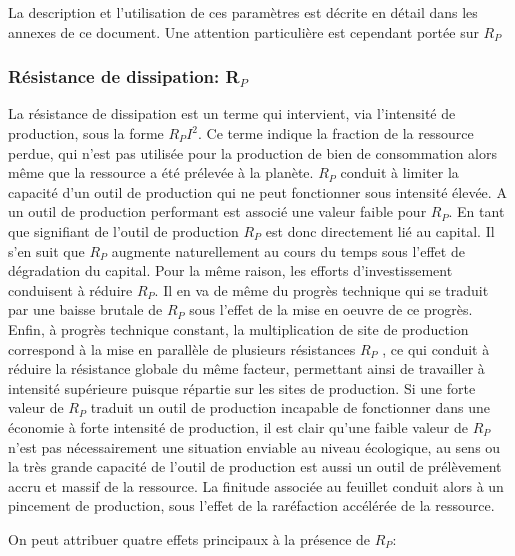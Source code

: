 \documentclass[12pt,a4paper]{article}%
\begin{document}
La description et l'utilisation de ces paramètres est décrite en détail
dans les annexes de ce document. Une attention particulière est cependant
portée sur $R_{P}$

\subsubsection{Résistance de dissipation: R$_{P}$}

La résistance de dissipation est un terme qui intervient, via l'intensité de
production, sous la forme $R_{P}I^{2}$. Ce terme indique la fraction de la
ressource perdue, qui n'est pas utilisée pour la production de bien de consommation
alors même que la ressource a été prélevée à la planète. $R_{P}$
conduit à limiter la capacité d'un outil de production qui ne peut
fonctionner sous intensité élevée. A un outil de production performant est
associé une valeur faible pour $R_{P}$. En tant que signifiant de l'outil de
production $R_{P}$ est donc directement lié au capital. Il s'en suit que
$R_{P}$ augmente naturellement au cours du temps sous l'effet de dégradation
du capital. Pour la même raison, les efforts d'investissement conduisent à
réduire $R_{P}$. Il en va de même du progrès technique qui se traduit par
une baisse brutale de $R_{P}$ sous l'effet de la mise en oeuvre de ce
progrès. Enfin, à progrès technique constant, la multiplication de
site de production correspond à la mise en parallèle de plusieurs
résistances $R_{P}$ , ce qui conduit à réduire la résistance globale du
même facteur, permettant ainsi de travailler à intensité supérieure
puisque répartie sur les sites de production. Si une forte valeur de $R_{P}$
traduit un outil de production incapable de fonctionner dans une économie
à forte intensité de production, il est clair qu'une faible valeur de
$R_{P}$ n'est pas nécessairement une situation enviable au niveau écologique,
au sens o{u} la très grande capacité de l'outil de production est aussi
un outil de prélèvement accru et massif de la ressource. La finitude
associée au feuillet conduit alors à un pincement de production, sous
l'effet de la raréfaction accélérée de la ressource.

On peut attribuer quatre effets principaux à la présence de $R_{P}$:
\end{document}
